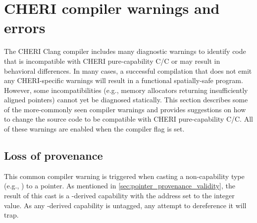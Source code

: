\documentclass[12pt,twoside,openright,usletter]{article}
\newcommand{\ccode}[1]{{\small\ttfamily{#1}}}
\newcommand{\commandline}[1]{{\ccode{#1}}}
\newcommand{\clongt}{{\ccode{long}}\xspace}
\newcommand{\note}[2]{{\color{blue}[ Note: #1 - #2]}}
\renewcommand{\note}[2]{\relax\ifhmode\unskip\fi}
\newcommand{\arnote}[1]{\note{#1}{Alex R.}}
\newcommand*{\cpp}[1][]{C\textsmaller[2]{\nolinebreak[4]\hspace{-.05em}\raisebox{.45ex}{\textbf{++}}}}
\newcommand*{\purecapCOrCpp}[1]{CHERI pure-capability C/\cpp{}}
\begin{document}
%
%

\section{CHERI compiler warnings and errors}
\label{sec:cheri-compiler-warnings-and-errors}

\arnote{Feed the source code into \url{https://cheri-compiler-explorer.cl.cam.ac.uk/} to get the latest warning text}

The CHERI Clang compiler includes many diagnostic warnings to identify code that is incompatible with \purecapCOrCpp{} or may result in behavioral differences.
In many cases, a successful compilation that does not emit any CHERI-specific warnings will result in a functional spatially-safe program.
However, some incompatibilities (e.g., memory allocators returning insufficiently aligned pointers) cannot yet be diagnosed statically.
This section describes some of the more-commonly seen compiler warnings and provides suggestions on how to change the source code to be compatible with \purecapCOrCpp{}.
All of these warnings are enabled when the \commandline{-Wall} compiler flag
is set.

\subsection{Loss of provenance}
This common compiler warning \arnote{that should be an error by default?} is triggered when casting a non-capability type (e.g., \clongt) to a pointer.
As mentioned in \cref{sec:pointer_provenance_validity}, the result of this cast is a \ccode{NULL}-derived capability with the address set to the integer value.
As any \ccode{NULL}-derived capability is untagged, any attempt to dereference it will trap.
\end{document}

